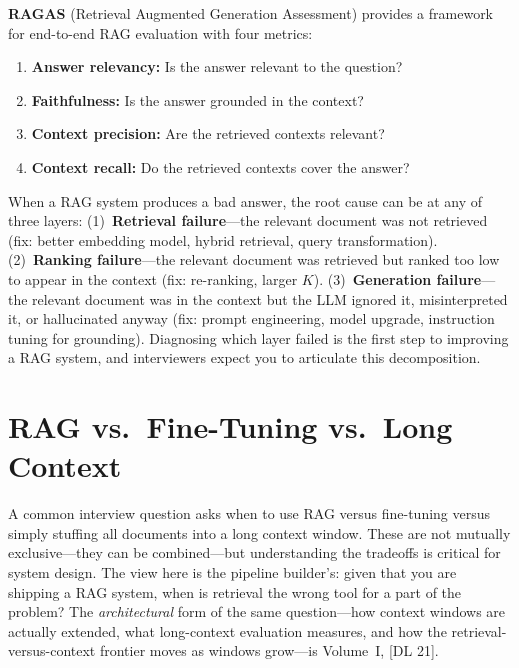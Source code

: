\textbf{RAGAS} (Retrieval Augmented Generation Assessment) provides a
framework for end-to-end RAG evaluation with four metrics:
\begin{enumerate}
    \item \textbf{Answer relevancy:} Is the answer relevant to the question?
    \item \textbf{Faithfulness:} Is the answer grounded in the context?
    \item \textbf{Context precision:} Are the retrieved contexts relevant?
    \item \textbf{Context recall:} Do the retrieved contexts cover the answer?
\end{enumerate}

\begin{keyinsight}
When a RAG system produces a bad answer, the root cause can be at any of three
layers: (1)~\textbf{Retrieval failure}---the relevant document was not
retrieved (fix: better embedding model, hybrid retrieval, query transformation).
(2)~\textbf{Ranking failure}---the relevant document was retrieved but ranked
too low to appear in the context (fix: re-ranking, larger $K$).
(3)~\textbf{Generation failure}---the relevant document was in the context but
the LLM ignored it, misinterpreted it, or hallucinated anyway (fix: prompt
engineering, model upgrade, instruction tuning for grounding).
Diagnosing which layer failed is the first step to improving a RAG system,
and interviewers expect you to articulate this decomposition.
\end{keyinsight}


\section{RAG vs.\ Fine-Tuning vs.\ Long Context}
\label{sec:rag-vs-ft}

A common interview question asks when to use RAG versus fine-tuning versus
simply stuffing all documents into a long context window.  These are not
mutually exclusive---they can be combined---but understanding the tradeoffs
is critical for system design.  The view here is the pipeline builder's: given
that you are shipping a RAG system, when is retrieval the wrong tool for a
part of the problem?  The \emph{architectural} form of the same question---how
context windows are actually extended, what long-context evaluation measures,
and how the retrieval-versus-context frontier moves as windows grow---is
Volume~I, [DL 21].

